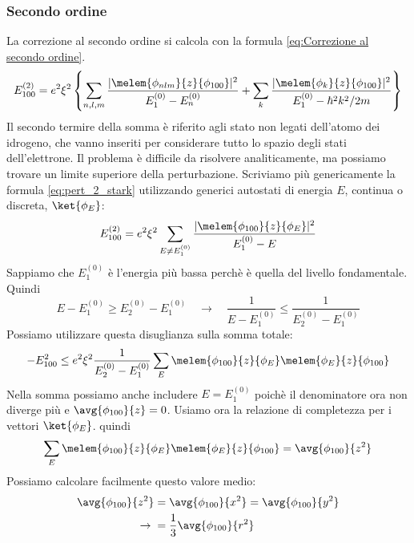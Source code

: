 \subsubsection{Secondo ordine}
La correzione al secondo ordine si calcola con la formula \vref{eq:Correzione al secondo ordine}.
\begin{equation}\label{eq:pert_2_stark}
E_{100}^{(2)} = e^2\xi^2 \left\{ \sum_{n,l,m} \frac{|\melem{\phi_{nlm}}{z}{\phi_{100}}|^2}{E_1^{(0)}-E_n^{(0)}} + \sum_{k} \frac{|\melem{\phi_k}{z}{\phi_{100}}|^2}{E_1^{(0)}-\hbar^2k^2/2m}\right\}
\end{equation}
Il secondo termire della somma è riferito agli stato non legati dell'atomo dei idrogeno, che vanno inseriti per considerare tutto lo spazio degli stati dell'elettrone. Il problema è difficile da risolvere analiticamente, ma possiamo trovare un limite superiore della perturbazione. Scriviamo più genericamente la formula \ref{eq:pert_2_stark} utilizzando generici autostati di energia $E$, continua o discreta, $\ket{\phi_E}$:
\begin{equation}
E_{100}^{(2)} = e^2\xi^2 \sum_{E \neq E_1^{(0)} } \frac{|\melem{\phi_{100}}{z}{\phi_E}|^2}{E_1^{(0)}-E}
\end{equation}
Sappiamo che $E_1^{(0)}$ è l'energia più bassa perchè è quella del livello fondamentale. 
Quindi 
\begin{equation}
E-E_1^{(0)} \ge E_2^{(0)}- E_1^{(0)} \quad \rightarrow \quad \frac{1}{E-E_1^{(0)}} \le \frac{1}{E_2^{(0)}-E_1^{(0)}}
\end{equation}
Possiamo utilizzare questa disuglianza sulla somma totale:
\begin{equation}
-E_{100}^2 \le e^2\xi^2 \frac{1}{E_2^{(0)}-E_1^{(0)}} \sum_E \melem{\phi_{100}}{z}{\phi_E}\melem{\phi_E}{z}{\phi_{100}}
\end{equation}
Nella somma possiamo anche includere $E=E_1^{(0)}$ poichè il denominatore ora non diverge più e $\avg{\phi_{100}}{z}=0$.
Usiamo ora la relazione di completezza per i vettori $\ket{\phi_E}$. quindi 
\begin{equation}
\sum_E \melem{\phi_{100}}{z}{\phi_E}\melem{\phi_E}{z}{\phi_{100}} = \avg{\phi_{100}}{z^2} 
\end{equation}
Possiamo calcolare facilmente questo valore medio:
\begin{align}
\avg{\phi_{100}}{z^2} &= \avg{\phi_{100}}{x^2} = \avg{\phi_{100}}{y^2} \nonumber \\
\rightarrow\;&= \frac{1}{3}\avg{\phi_{100}}{r^2}
\end{align}